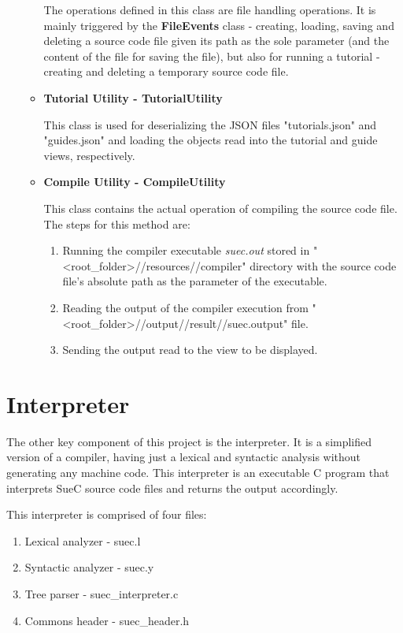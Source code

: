 \documentclass[12pt,a4paper,twoside]{report}
\begin{document}
\begin{enumerate}
\begin{itemize}
	The operations defined in this class are file handling operations. It is mainly triggered by the \textbf{FileEvents} class - creating, loading, saving and deleting a source code file given its path as the sole parameter (and the content of the file for saving the file), but also for running a tutorial - creating and deleting a temporary source code file.
\item \textbf{Tutorial Utility - TutorialUtility}

	This class is used for deserializing the JSON files "tutorials.json" and "guides.json" and loading the objects read into the tutorial and guide views, respectively.

\item \textbf{Compile Utility - CompileUtility}
	
	This class contains the actual operation of compiling the source code file. The steps for this method are: 
	\begin{enumerate}
	\item Running the compiler executable \textit{suec.out} stored in "<root\_folder>//resources//compiler" directory with the source code file's absolute path as the parameter of the executable.
	\item Reading the output of the compiler execution from "<root\_folder>//output//result//suec.output" file.
	\item Sending the output read to the view to be displayed.
	\end{enumerate}
\end{itemize}
\end{enumerate}

\section{Interpreter}

The other key component of this project is the interpreter. It is a simplified version of a compiler, having just a lexical and syntactic analysis without generating any machine code. This interpreter is an executable C program that interprets SueC source code files and returns the output accordingly.

This interpreter is comprised of four files:
\begin{enumerate}
\item Lexical analyzer - suec.l
\item Syntactic analyzer - suec.y
\item Tree parser - suec\_interpreter.c 
\item Commons header - suec\_header.h
\end{enumerate}
\end{document}
